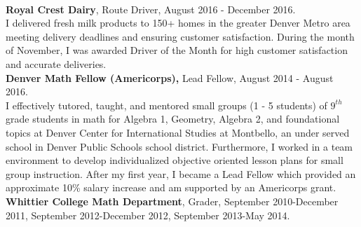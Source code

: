\documentclass[letterpaper]{article}
\begin{document}
\vspace{.2cm}\\
{\bf Royal Crest Dairy}, Route Driver, August 2016 - December 2016. \\
{\small I delivered fresh milk products to 150+ homes in the greater Denver Metro area meeting delivery deadlines and ensuring customer satisfaction.  During the month of November, I was awarded Driver of the Month for high customer satisfaction and accurate deliveries. }\vspace{.2cm}\\
{\bf Denver Math Fellow (Americorps),} Lead Fellow, August 2014 - August 2016. \\
{\small I effectively tutored, taught, and mentored small groups (1 - 5 students) of $9^{th}$ grade students in math for Algebra 1, Geometry, Algebra 2, and foundational topics at Denver Center for International Studies at Montbello, an under served school in Denver Public Schools school district. Furthermore, I worked in a team environment to develop individualized objective oriented lesson plans for small group instruction. After my first year, I became a Lead Fellow which provided an approximate 10\% salary increase and am supported by an Americorps grant.} \vspace{.2cm}\\
{\bf Whittier College Math Department}, Grader, September 2010-December 2011, September 2012-December 2012, September 2013-May 2014. 
\end{document}
